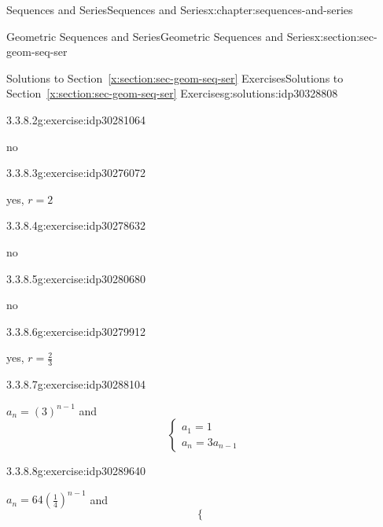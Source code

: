 \documentclass[twoside,10pt,]{book}
\newcommand{\xreffont}{\relax}
\numberwithin{equation}{section}
\begin{document}
\begin{chapterptx}{Sequences and Series}{}{Sequences and Series}{}{}{x:chapter:sequences-and-series}
\begin{sectionptx}{Geometric Sequences and Series}{}{Geometric Sequences and Series}{}{}{x:section:sec-geom-seq-ser}
\begin{solutions-subsection}{Solutions to Section~{\xreffont\ref*{x:section:sec-geom-seq-ser}} Exercises}{}{Solutions to Section~{\xreffont\ref*{x:section:sec-geom-seq-ser}} Exercises}{}{}{g:solutions:idp30328808}
\begin{exercisegroup}
\begin{divisionsolutioneg}{3.3.8.2}{}{g:exercise:idp30281064}%
\par\smallskip%
\noindent\hypertarget{g:solution:idp30278120-main}{}no\end{divisionsolutioneg}%
\begin{divisionsolutioneg}{3.3.8.3}{}{g:exercise:idp30276072}%
\par\smallskip%
\noindent\hypertarget{g:solution:idp30276584-main}{}yes, \(r=2\)\end{divisionsolutioneg}%
\begin{divisionsolutioneg}{3.3.8.4}{}{g:exercise:idp30278632}%
\par\smallskip%
\noindent\hypertarget{g:solution:idp30281192-main}{}no\end{divisionsolutioneg}%
\begin{divisionsolutioneg}{3.3.8.5}{}{g:exercise:idp30280680}%
\par\smallskip%
\noindent\hypertarget{g:solution:idp30282088-main}{}no\end{divisionsolutioneg}%
\begin{divisionsolutioneg}{3.3.8.6}{}{g:exercise:idp30279912}%
\par\smallskip%
\noindent\hypertarget{g:solution:idp30278760-main}{}yes, \(r=\frac{2}{3}\)\end{divisionsolutioneg}%
\end{exercisegroup}
\par\medskip\noindent
\begin{exercisegroup}
\begin{divisionsolutioneg}{3.3.8.7}{}{g:exercise:idp30288104}%
\par\smallskip%
\noindent\hypertarget{g:solution:idp30291176-main}{}\({a_n} = {\left( 3 \right)^{n - 1}}\) and%
\begin{equation*}
\left\{ \begin{array}{l}
{a_1} = 1\\
{a_n} = 3{a_{n - 1}}
\end{array} \right.
\end{equation*}
\end{divisionsolutioneg}%
\begin{divisionsolutioneg}{3.3.8.8}{}{g:exercise:idp30289640}%
\par\smallskip%
\noindent\hypertarget{g:solution:idp30284392-main}{}\({a_n} = 64{\left( {\frac{1}{4}} \right)^{n - 1}}\) and%
\begin{equation*}
\left\{ \begin{array}{l}

\end{array}
\end{equation*}
\end{divisionsolutioneg}
\end{exercisegroup}
\end{solutions-subsection}
\end{sectionptx}
\end{chapterptx}
\end{document}
